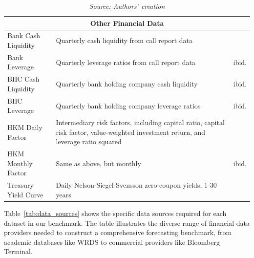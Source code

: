 \documentclass{article}
\begin{document}
\begin{table}[htbp]
\begin{tabular}{p{3cm}p{6cm}p{3.5cm}}
\midrule
\multicolumn{3}{c}{\textbf{Other Financial Data}} \\
\midrule
Bank Cash Liquidity & Quarterly cash liquidity from call report data & \cite{Drechsler2017} \\
Bank Leverage & Quarterly leverage ratios from call report data & ibid. \\
BHC Cash Liquidity & Quarterly bank holding company cash liquidity & ibid. \\
BHC Leverage & Quarterly bank holding company leverage ratios & ibid. \\
HKM Daily Factor & Intermediary risk factors, including capital ratio, capital risk factor, value-weighted investment return, and leverage ratio squared & \cite{He2017} \\
HKM Monthly Factor & Same as above, but monthly & ibid. \\
Treasury Yield Curve & Daily Nelson-Siegel-Svensson zero-coupon yields, 1-30 years & \cite{Gurkaynak2007} \\
\bottomrule
\end{tabular}
\caption*{\emph{Source: Authors' creation}}
\end{table}

Table~\ref{tab:data_sources} shows the specific data sources required for each dataset in our benchmark. The table illustrates the diverse range of financial data providers needed to construct a comprehensive forecasting benchmark, from academic databases like WRDS to commercial providers like Bloomberg Terminal.
\end{document}
